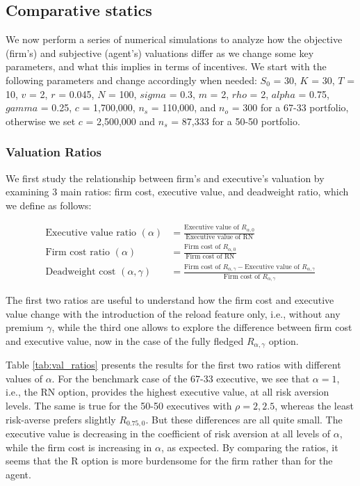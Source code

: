 \subsection{Comparative statics}
We now perform a series of numerical simulations to analyze how the objective (firm's) and subjective (agent's) valuations differ as we change some key parameters, and what this implies in terms of incentives. We start with the following parameters and change accordingly when needed: $S_0$ = 30, $K$ = 30, $T$ = 10, $v$ = 2, $r$ = 0.045, $N$ = 100, $sigma$ = 0.3, $m$ = 2, $rho$ = 2, $alpha$ = 0.75, $gamma$ = 0.25, $c$ = 1,700,000, $n_s$ = 110,000, and $n_o$ = 300 for a 67-33 portfolio, otherwise we set $c$ = 2,500,000 and $n_s$ = 87,333 for a 50-50 portfolio.

\subsubsection{Valuation Ratios}
We first study the relationship between firm's and executive's valuation by examining 3 main ratios: firm cost, executive value, and deadweight ratio, which we define as follows:

\vspace{-2em}
\begin{align*}
    \text{Executive value ratio } (\alpha) &= \frac{\text{Executive value of } R_{\alpha,0}}{\text{Executive value of RN}} \\[1em]
    \text{Firm cost ratio } (\alpha) & = \frac{\text{Firm cost of } R_{\alpha,0}}{\text{Firm cost of RN}} \\[1em]
    \text{Deadweight cost } (\alpha, \gamma) &= \frac{\text{Firm cost of } R_{\alpha,\gamma} - \text{Executive value of } R_{\alpha,\gamma}}{\text{Firm cost of }R_{\alpha,\gamma}}
\end{align*}
\vspace{-2em}

The first two ratios are useful to understand how the firm cost and executive value change with the introduction of the reload feature only, i.e., without any premium $\gamma$, while the third one allows to explore the difference between firm cost and executive value, now in the case of the fully fledged $R_{\alpha,\gamma}$ option. %

Table \ref*{tab:val_ratios} presents the results for the first two ratios with different values of $\alpha$. For the benchmark case of the 67-33 executive, we see that $\alpha = 1$, i.e., the RN option, provides the highest executive value, at all risk aversion levels. The same is true for the 50-50 executives with $\rho = 2, 2.5$, whereas the least risk-averse prefers slightly $R_{0.75,0}$. But these differences are all quite small. The executive value is decreasing in the coefficient of risk aversion at all levels of $\alpha$, while the firm cost is increasing in $\alpha$, as expected. By comparing the ratios, it seems that the R option is more burdensome for the firm rather than for the agent.  



